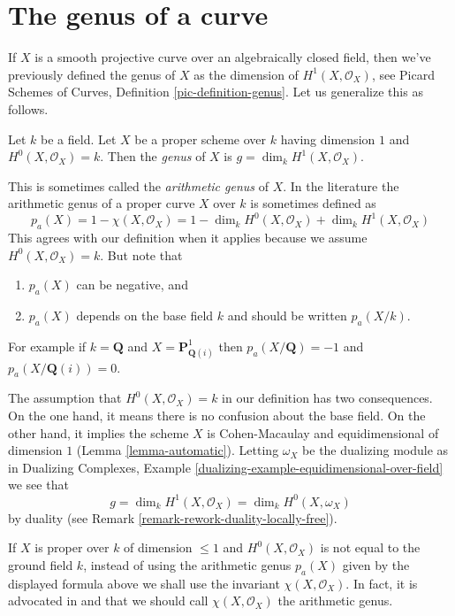 \section{The genus of a curve}
\label{section-genus}

\noindent
If $X$ is a smooth projective curve over an algebraically closed field,
then we've previously defined the genus of $X$ as the dimension of
$H^1(X, \mathcal{O}_X)$, see
Picard Schemes of Curves, Definition \ref{pic-definition-genus}.
Let us generalize this as follows.

\begin{definition}
\label{definition-genus}
Let $k$ be a field. Let $X$ be a proper scheme over $k$ having
dimension $1$ and $H^0(X, \mathcal{O}_X) = k$.
Then the {\it genus} of $X$ is $g = \dim_k H^1(X, \mathcal{O}_X)$.
\end{definition}

\noindent
This is sometimes called the {\it arithmetic genus} of $X$.
In the literature the arithmetic genus of a proper curve $X$
over $k$ is sometimes defined as
$$
p_a(X) = 1 - \chi(X, \mathcal{O}_X) =
1 - \dim_k H^0(X, \mathcal{O}_X) + \dim_k H^1(X, \mathcal{O}_X)
$$
This agrees with our definition when it applies because we assume
$H^0(X, \mathcal{O}_X) = k$. But note that
\begin{enumerate}
\item $p_a(X)$ can be negative, and
\item $p_a(X)$ depends on the base field $k$ and should be written $p_a(X/k)$.
\end{enumerate}
For example if $k = \mathbf{Q}$
and $X = \mathbf{P}^1_{\mathbf{Q}(i)}$ then
$p_a(X/\mathbf{Q}) = -1$ and $p_a(X/\mathbf{Q}(i)) = 0$.

\medskip\noindent
The assumption that $H^0(X, \mathcal{O}_X) = k$ in our definition has
two consequences. On the one hand, it means there is no confusion about
the base field. On the other hand, it implies the scheme $X$ is
Cohen-Macaulay and equidimensional of dimension $1$
(Lemma \ref{lemma-automatic}). Letting $\omega_X$ be the dualizing
module as in Dualizing Complexes, Example
\ref{dualizing-example-equidimensional-over-field}
we see that
\begin{equation}
\label{equation-genus}
g = \dim_k H^1(X, \mathcal{O}_X) = \dim_k H^0(X, \omega_X)
\end{equation}
by duality (see Remark \ref{remark-rework-duality-locally-free}).

\medskip\noindent
If $X$ is proper over $k$ of dimension $\leq 1$ and $H^0(X, \mathcal{O}_X)$
is not equal to the ground field $k$, instead of using the arithmetic genus
$p_a(X)$ given by the displayed formula above we shall use the invariant
$\chi(X, \mathcal{O}_X)$. In fact, it is advocated in
\cite[page 276]{FAC} and \cite[Introduction]{Hirzebruch}
that we should call $\chi(X, \mathcal{O}_X)$ the arithmetic genus.

